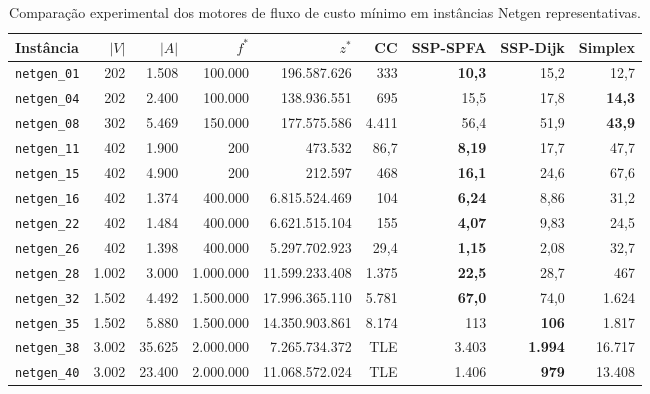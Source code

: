 \begin{table}[!ht]
\centering
\small
\setlength{\tabcolsep}{3.5pt}
\begin{tabular}{lrrrrrrrr}
\toprule
\textbf{Instância} & $|V|$ & $|A|$ & $f^*$ & $z^*$ & \textbf{CC} & \textbf{SSP-SPFA} & \textbf{SSP-Dijk} & \textbf{Simplex} \\
\midrule
\texttt{netgen\_01} & 202 & 1.508 & 100.000 & 196.587.626 & 333 & \textbf{10,3} & 15,2 & 12,7 \\
\texttt{netgen\_04} & 202 & 2.400 & 100.000 & 138.936.551 & 695 & 15,5 & 17,8 & \textbf{14,3} \\
\texttt{netgen\_08} & 302 & 5.469 & 150.000 & 177.575.586 & 4.411 & 56,4 & 51,9 & \textbf{43,9} \\
\texttt{netgen\_11} & 402 & 1.900 & 200 & 473.532 & 86,7 & \textbf{8,19} & 17,7 & 47,7 \\
\texttt{netgen\_15} & 402 & 4.900 & 200 & 212.597 & 468 & \textbf{16,1} & 24,6 & 67,6 \\
\texttt{netgen\_16} & 402 & 1.374 & 400.000 & 6.815.524.469 & 104 & \textbf{6,24} & 8,86 & 31,2 \\
\texttt{netgen\_22} & 402 & 1.484 & 400.000 & 6.621.515.104 & 155 & \textbf{4,07} & 9,83 & 24,5 \\
\texttt{netgen\_26} & 402 & 1.398 & 400.000 & 5.297.702.923 & 29,4 & \textbf{1,15} & 2,08 & 32,7 \\
\texttt{netgen\_28} & 1.002 & 3.000 & 1.000.000 & 11.599.233.408 & 1.375 & \textbf{22,5} & 28,7 & 467 \\
\texttt{netgen\_32} & 1.502 & 4.492 & 1.500.000 & 17.996.365.110 & 5.781 & \textbf{67,0} & 74,0 & 1.624 \\
\texttt{netgen\_35} & 1.502 & 5.880 & 1.500.000 & 14.350.903.861 & 8.174 & 113 & \textbf{106} & 1.817 \\
\texttt{netgen\_38} & 3.002 & 35.625 & 2.000.000 & 7.265.734.372 & TLE & 3.403 & \textbf{1.994} & 16.717 \\
\texttt{netgen\_40} & 3.002 & 23.400 & 2.000.000 & 11.068.572.024 & TLE & 1.406 & \textbf{979} & 13.408 \\
\bottomrule
\end{tabular}
\caption{Comparação experimental dos motores de fluxo de custo mínimo em instâncias Netgen representativas.}
\label{tab:benchmarks_mincost}
\end{table}
